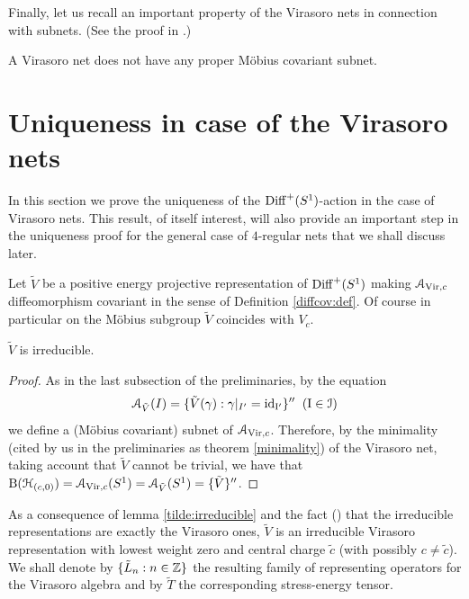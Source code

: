 \documentclass[12pt]{article}
\begin{document}
Finally, let us recall an important property of the
Virasoro nets in connection with subnets. (See the
proof in \cite{Carpi98}.)
\begin{theorem}
\label{minimality}
A Virasoro net does not have any proper 
M\"obius covariant subnet.
\end{theorem}
 
\section{Uniqueness in case of the Virasoro nets}
\label{sectuniqvir}
In this section we prove the uniqueness of the ${{\rm Diff}^+(S^1)}$-action in the case 
of Virasoro nets. This result, of itself interest, will also provide an 
important step in the uniqueness proof for the general case of 
$4$-regular nets that we shall discuss later. 

Let $\tilde{V}$ be a positive energy projective representation of
${{\rm Diff}^+(S^1)}$ making ${\mathcal A}_{{\rm Vir},c}$ diffeomorphism covariant in the 
sense of Definition \ref{diffcov:def}. Of course in particular on the
M\"obius subgroup $\tilde{V}$ coincides with $V_c$. 
\begin{lemma} 
\label{tilde:irreducible}
$\tilde{V}$ is irreducible.
\end{lemma}
\begin{proof} 
As in the last subsection of the preliminaries, by the equation
\begin{equation}
{\mathcal A}_{\tilde{V}} (I)=\{\tilde{V}(\gamma): \gamma|_{I'}=\rm{id}_{I'}\}''
\;\;(I \in {\mathcal I})
\end{equation}
we define a (M\"obius covariant) subnet of ${\mathcal A}_{{\rm Vir},c}$.
Therefore, by the minimality (cited by us in
the preliminaries as theorem \ref{minimality}) 
of the Virasoro net, taking account that
$\tilde{V}$
cannot be trivial, we have that
${\rm B}({\mathcal H}_{(c,0)})={\mathcal A}_{{\rm{Vir}},c}(S^1)=
{\mathcal A}_{\tilde{V}}(S^1)=\{\tilde{V}\}''$. 
\end{proof}

As a consequence of lemma \ref{tilde:irreducible} 
and the fact (\cite[Theorem A.1]{Carpi03b}) that the irreducible
representations are exactly the Virasoro ones, $\tilde{V}$ is an
irreducible Virasoro representation with lowest weight zero and central
charge $\tilde{c}$ (with possibly $c \neq \tilde{c}$).
We shall denote by $\{\tilde{L}_n: n\in {\mathbb Z} \}$ the 
resulting family of representing operators for the Virasoro algebra
and by $\tilde{T}$ the corresponding stress-energy tensor.
\end{document}
